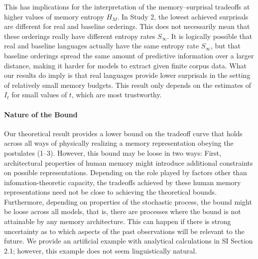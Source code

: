This has implications for the interpretation of the memory--surprisal tradeoffs at higher values of memory entropy $H_M$.
In Study 2, the lowest achieved surprisals are different for real and baseline orderings.
This does not necessarily mean that these orderings really have different entropy rates $S_\infty$.
It is logically possible that real and baseline languages actually have the same entropy rate $S_\infty$, but that baseline orderings spread the same amount of predictive information over a larger distance, making it harder for models to extract given finite corpus data.
What our results do imply is that real languages provide lower surprisals in the setting of relatively small memory budgets. This result only depends on the estimates of $I_t$ for small values of $t$, which are most trustworthy.


\paragraph{Nature of the Bound}
Our theoretical result provides a lower bound on the tradeoff curve that holds across all ways of physically realizing a memory representation obeying the postulates (1--3).
However, this bound may be loose in two ways:
First, architectural properties of human memory might introduce additional constraints on possible representations.
Depending on the role played by factors other than infomation-theoretic capacity, the tradeoffs achieved by these human memory representations need not be close to achieving the theoretical bounds.
%
Furthermore, depending on properties of the stochastic process, the bound might be loose across all models, that is, there are processes where the bound is not attainable by any memory architecture.
This can happen if there is strong uncertainty as to which aspects of the past observations will be relevant to the future.
We provide an artificial example with analytical calculations in SI Section 2.1; however, this example does not seem linguistically natural.

